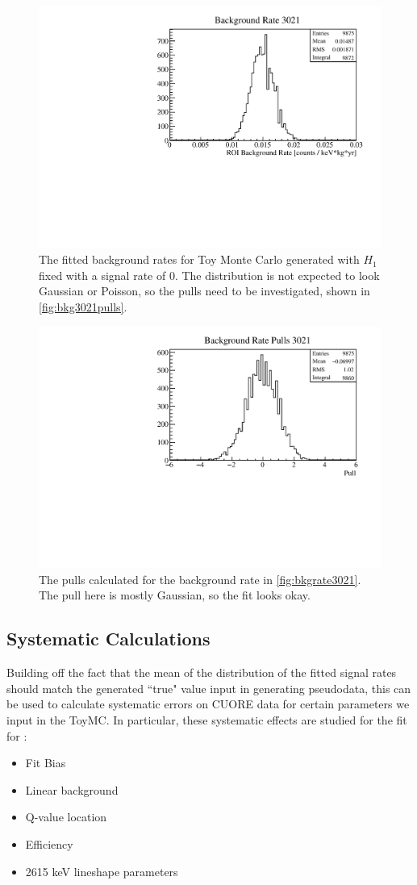 \begin{figure}
\centering
\includegraphics[width=0.7\linewidth]{Figures/Appendix_Figures/Bkg3021Rate.pdf}
\caption{The fitted background rates for Toy Monte Carlo generated with $H_1$ fixed with a signal rate of 0.
The distribution is not expected to look Gaussian or Poisson, so the pulls need to be investigated, shown in \autoref{fig:bkg3021pulls}.}
\label{fig:bkgrate3021}
\end{figure}

\begin{figure}
\centering
\includegraphics[width=0.7\linewidth]{Figures/Appendix_Figures/Bkg3021Pulls.pdf}
\caption{The pulls calculated for the background rate in \autoref{fig:bkgrate3021}.
The pull here is mostly Gaussian, so the fit looks okay.}
\label{fig:bkg3021pulls}
\end{figure}

\subsection*{Systematic Calculations}
\label{ssec:Systematic Calculations}
Building off the fact that the mean of the distribution of the fitted signal rates should match the generated ``true" value input in generating pseudodata, this can be used to calculate systematic errors on CUORE data for certain parameters we input in the ToyMC.
In particular, these systematic effects are studied for the fit for \zeronubb:
\begin{itemize}
\item Fit Bias
\item Linear background
\item Q-value location
\item Efficiency
\item 2615 keV lineshape parameters
\end{itemize}

